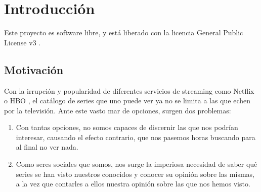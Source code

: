 \chapter{Introducción}

Este proyecto es software libre, y está liberado con la licencia General Public License v3 \cite{gplv3}.

\section{Motivación}
Con la irrupción y popularidad de diferentes servicios de streaming como Netflix \cite{Netflix} o HBO \cite{HBO}, el catálogo de series que uno puede ver ya no se limita a las que echen por la televisión. Ante este vasto mar de opciones, surgen dos problemas:
\begin{enumerate}
    \item Con tantas opciones, no somos capaces de discernir las que nos podrían interesar, causando el efecto contrario, que nos pasemos horas buscando para al final no ver nada.
    \item Como seres sociales que somos, nos surge la imperiosa necesidad de saber qué series se han visto nuestros conocidos y conocer su opinión sobre las mismas, a la vez que contarles a ellos nuestra opinión sobre las que nos hemos visto.
\end{enumerate}

